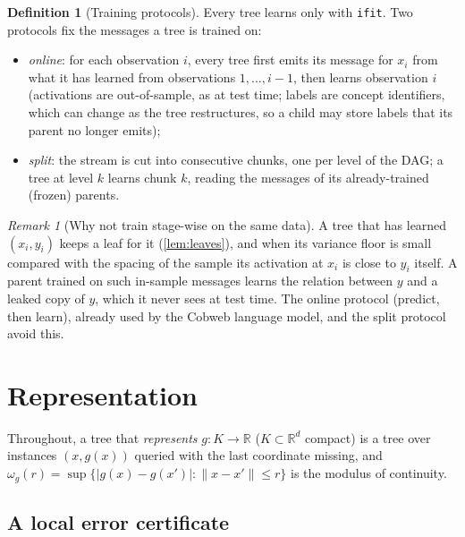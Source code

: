 \documentclass[11pt]{article}
\theoremstyle{definition}
\newtheorem{definition}[theorem]{Definition}
\theoremstyle{remark}
\newtheorem{remark}[theorem]{Remark}
\newcommand{\R}{\mathbb{R}}
\begin{document}
\begin{definition}[Training protocols]\label{def:forestlearn}
Every tree learns only with \texttt{ifit}.  Two protocols fix the messages a tree is
trained on:
\begin{itemize}[leftmargin=*]
\item \emph{online}: for each observation $i$, every tree first emits its message for
  $x_i$ from what it has learned from observations $1,\dots,i-1$, then learns
    observation $i$ (activations are out-of-sample, as at test time; labels are concept
  identifiers, which can change as the tree restructures, so a child may store labels
  that its parent no longer emits);
\item \emph{split}: the stream is cut into consecutive chunks, one per level of the DAG;
  a tree at level $k$ learns chunk $k$, reading the messages of its already-trained
  (frozen) parents.
\end{itemize}
\end{definition}

\begin{remark}[Why not train stage-wise on the same data]
A tree that has learned $(x_i,y_i)$ keeps a leaf for it (\cref{lem:leaves}), and when
its variance floor is small compared with the spacing of the sample its activation at
$x_i$ is close to $y_i$ itself.  A parent trained on such in-sample
messages learns the relation between $y$ and a leaked copy of $y$, which it never sees at
test time.  The online protocol (predict, then learn), already used by the Cobweb
language model, and the split protocol avoid this.
\end{remark}

\section{Representation}\label{sec:repr}

Throughout, a tree that \emph{represents} $g:K\to\R$ ($K\subset\R^d$ compact) is a tree
over instances $(x,g(x))$ queried with the last coordinate missing, and
$\omega_g(r)=\sup\{|g(x)-g(x')|:\|x-x'\|\le r\}$ is the modulus of continuity.

\subsection{A local error certificate}
\end{document}
